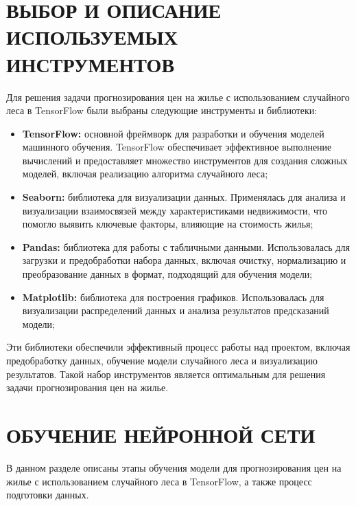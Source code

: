 {\newpage
\section{\MakeUppercase{Выбор и описание используемых инструментов}}
{

Для решения задачи прогнозирования цен на жилье с использованием случайного леса в TensorFlow были выбраны следующие инструменты и библиотеки: 
    \begin{itemize}
        \item \textbf{TensorFlow:} основной фреймворк для разработки и обучения моделей машинного обучения. TensorFlow обеспечивает эффективное выполнение вычислений и предоставляет множество инструментов для создания сложных моделей, включая реализацию алгоритма случайного леса;
        \item \textbf{Seaborn:} библиотека для визуализации данных. Применялась для анализа и визуализации взаимосвязей между характеристиками недвижимости, что помогло выявить ключевые факторы, влияющие на стоимость жилья;
        \item \textbf{Pandas:} библиотека для работы с табличными данными. Использовалась для загрузки и предобработки набора данных, включая очистку, нормализацию и преобразование данных в формат, подходящий для обучения модели;
        \item \textbf{Matplotlib:} библиотека для построения графиков. Использовалась для визуализации распределений данных и анализа результатов предсказаний модели;
    \end{itemize}
    Эти библиотеки обеспечили эффективный процесс работы над проектом, включая предобработку данных, обучение модели случайного леса и визуализацию результатов. Такой набор инструментов является оптимальным для решения задачи прогнозирования цен на жилье.
}

\newpage
\section{\MakeUppercase{Обучение нейронной сети}}
В данном разделе описаны этапы обучения модели для прогнозирования цен на жилье с использованием случайного леса в TensorFlow, а также процесс подготовки данных.
{
}}
